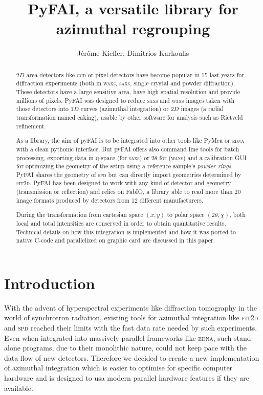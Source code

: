 \documentclass[a4paper]{jpconf}
\begin{document}
\title{PyFAI, a versatile library for azimuthal regrouping}

\author{J\'er\^ome Kieffer, Dimitrios Karkoulis}

\address{European Synchrotron Radiation Facility; 6 rue Jules Horowitz;
38043 Grenoble; France}


\begin{abstract}
$2D$ area detectors like \textsc{ccd} or pixel detectors have become popular
in 15 last years for diffraction experiments (both in \textsc{waxs},
\textsc{saxs}, single crystal and powder diffraction).
These detectors have a large sensitive area, have high spatial
resolution and provide millions of pixels. PyFAI was designed to reduce \textsc{saxs} and
\textsc{waxs} images taken with those detectors into $1D$ curves (azimuthal
integration) or $2D$ images (a radial transformation named caking), usable by other software
for analysis such as Rietveld refinement.

As a library, the aim of pyFAI is to be integrated into other tools like
PyMca\cite{pymca} or \textsc{edna}\cite{edna} with a clean pythonic interface. But pyFAI
offers also command line tools for batch processing, exporting data in q-space (for \textsc{saxs}) or 2$\theta$ for
(\textsc{waxs}) and a calibration GUI for optimizing the geometry of the setup
using a reference sample's \textit{powder rings}.  PyFAI shares the geometry
of \textsc{spd}\cite{spd} but can directly import geometries determined by
\textsc{fit2d}\cite{fit2d1996}.
PyFAI has been designed to work with any kind of detector and geometry (transmission or reflection) and
relies on FabIO\cite{fabio}, a library able to read more than 20 image
formats produced by detectors from 12 different manufacturers.

During the transformation from cartesian space $(x,y)$ to polar
space $(2\theta, \chi )$, both local and total intensities are conserved
in order to obtain quantitative results. Technical details on how this
integration is implemented and how it was ported to native C-code and parallelized on graphic card are
discussed in this paper.
\end{abstract}

\section{Introduction}

With the advent of hyperspectral experiments like diffraction tomography in the
world of synchrotron radiation, existing tools for azimuthal integration like
\textsc{fit2d}\cite{fit2d1996} and \textsc{spd}\cite{spd} reached their limits with the fast data rate
needed by such experiments. Even when integrated into massively parallel
frameworks like \textsc{edna}\cite{edna}, such stand-alone programs, due to their
monolithic nature, could not keep pace with the data flow of new detectors.
Therefore we decided to create a new implementation of azimuthal integration
which is easier to optimise for specific computer hardware and is designed to
usa modern parallel hardware features if they are available.
\end{document}
